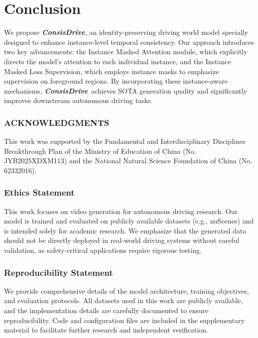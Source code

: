 \documentclass{article} %
\def\titleDef{\textbf{\textit{ConsisDrive}}}
\begin{document}
\section{Conclusion}
\label{section: conclusion}
We propose \titleDef, an identity-preserving driving world model specially designed to enhance instance-level temporal consistency. Our approach introduces two key advancements: 
the Instance Masked Attention module, which explicitly directs the model’s attention to each individual instance, 
and the Instance Masked Loss Supervision, which employs instance masks to emphasize supervision on foreground regions. 
By incorporating these instance-aware mechanisms, \titleDef~achieves SOTA generation quality and significantly improves downstream autonomous driving tasks. 




\subsubsection*{ACKNOWLEDGMENTS}  
This work was supported by 
the Fundamental and Interdisciplinary Disciplines Breakthrough Plan of the Ministry of Education of China (No. JYB2025XDXM113)
and
the National Natural Science Foundation of China (No. 62332016).



\subsubsection*{Ethics Statement}  
This work focuses on video generation for autonomous driving research.  
Our model is trained and evaluated on publicly available datasets (e.g., nuScenes) and is intended solely for academic research.  
We emphasize that the generated data should not be directly deployed in real-world driving systems without careful validation, as safety-critical applications require rigorous testing.  

\subsubsection*{Reproducibility Statement}  
We provide comprehensive details of the model architecture, training objectives, and evaluation protocols. 
All datasets used in this work are publicly available, and the implementation details are carefully documented to ensure reproducibility.
Code and configuration files are included in the supplementary material to facilitate further research and independent verification.  





\clearpage




%

% 
%
\end{document}
